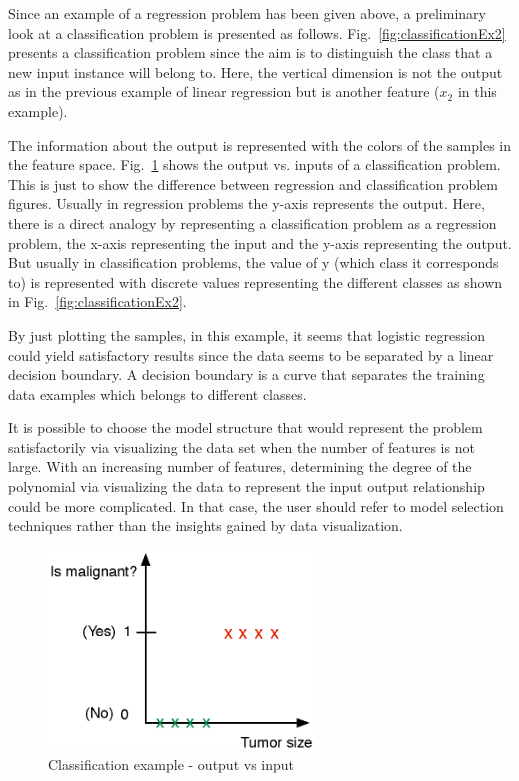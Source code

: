 Since an example of a regression problem has been given above, a preliminary look at a classification problem is presented as follows. 
Fig.~\ref{fig:classificationEx2} presents a classification problem since the aim is to distinguish the class that a new input instance will belong to. 
Here, the vertical dimension is not the output as in the previous example of linear regression but is another feature ($x_2$ in this example). 

The information about the output is represented with the colors of the samples in the feature space.
Fig.~\ref{fig:classificationEx1} shows the output vs. inputs of a classification problem. 
This is just to show the difference between regression and classification problem figures. 
Usually in regression problems the y-axis represents the output. 
Here, there is a direct analogy by representing a classification problem as a regression problem, the x-axis representing the input and the y-axis representing the output. 
But usually in classification problems, the value of y (which class it corresponds to) is represented with discrete values representing the different classes as shown in Fig.~\ref{fig:classificationEx2}.

By just plotting the samples, in this example, it seems that logistic regression could yield satisfactory results since the data seems to be separated by a linear decision boundary. 
A decision boundary is a curve that separates the training data examples which belongs to different classes. 

It is possible to choose the model structure that would represent the problem satisfactorily via visualizing the data set when the number of features is not large.
With an increasing number of features, determining the degree of the polynomial via visualizing the data to represent the input output relationship could be more complicated. 
In that case, the user should refer to model selection techniques rather than the insights gained by data visualization. 

\begin{figure}
\begin{center}
\includegraphics[width=7cm]{figures/classificationEx1}    %
\caption{Classification example - output vs input} 
\label{fig:classificationEx1}
\end{center}
\end{figure}


